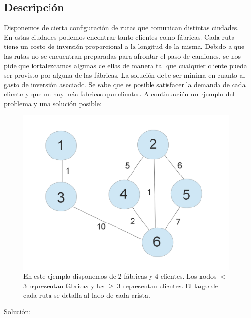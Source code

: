 \subsection{Descripción}

Disponemos de cierta configuración de rutas que comunican distintas ciudades. En estas ciudades podemos encontrar tanto clientes como fábricas. Cada ruta tiene un costo de inversión proporcional a la longitud de la misma. Debido a que las rutas no se encuentran preparadas para afrontar el paso de camiones, se nos pide que fortalezcamos algunas de ellas de manera tal que cualquier cliente pueda ser provisto por alguna de las fábricas. La solución debe ser mínima en cuanto al gasto de inversión asociado. Se sabe que es posible satisfacer la demanda de cada cliente y que no hay más fábricas que clientes. A continuación un ejemplo del problema y una solución posible:


\begin{figure}[H]
\center
\includegraphics[scale=0.3]{ej3/imgs/graph1.png}
\caption[Long caption]{En este ejemplo disponemos de 2 fábricas y 4 clientes. Los nodos $<$ 3 representan fábricas y los $\geq \ 3$ representan clientes. El largo de cada ruta se detalla al lado de cada arista.}
\label{pic-a}
\end{figure}

Solución:

